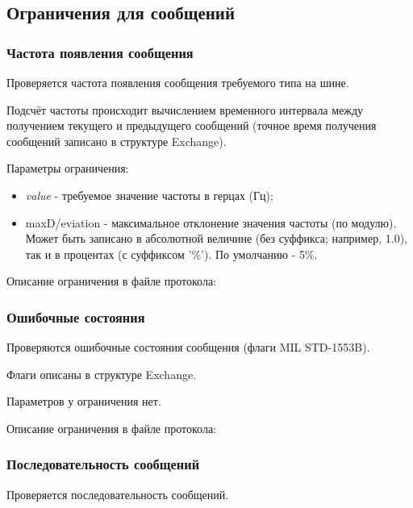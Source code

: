 \subsection{Ограничения для сообщений}

\subsubsection{Частота появления сообщения}

Проверяется частота появления сообщения требуемого типа на шине.

Подсчёт частоты происходит вычислением временного интервала между получением 
текущего и предыдущего сообщений (точное время получения сообщений записано в 
структуре Exchange).

Параметры ограничения:

\begin{itemize}
 \item \textit{value} - требуемое значение частоты в герцах (Гц);
 \item maxD/eviation - максимальное отклонение значения частоты (по модулю).  
Может быть записано в абсолютной величине (без суффикса; например, 1.0), так и 
в процентах (с суффиксом '\%'). По умолчанию - 5\%.
\end{itemize}

Описание ограничения в файле протокола:



\subsubsection{Ошибочные состояния}

Проверяются ошибочные состояния сообщения (флаги MIL STD-1553B).

Флаги описаны в структуре Exchange.

Параметров у ограничения нет.

Описание ограничения в файле протокола:



\subsubsection{Последовательность сообщений}

Проверяется последовательность сообщений.

